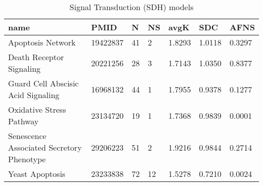 \begin{table}
\caption{Signal Transduction (SDH) models}
\label{tab:Signal_Transduction_(SDH)}
\begin{tabular}{|p{180pt}||p{40pt}|p{25pt}|p{25pt}|p{40pt}|p{25pt}|p{25pt}|}
\toprule
name & PMID & N & NS & avgK & SDC & AFNS \\
\midrule
Apoptosis Network & 19422837 & 41 & 2 & 1.8293 & 1.0118 & 0.3297 \\
Death Receptor Signaling & 20221256 & 28 & 3 & 1.7143 & 1.0350 & 0.8377 \\
Guard Cell Abscisic Acid Signaling & 16968132 & 44 & 1 & 1.7955 & 0.9378 & 0.1277 \\
Oxidative Stress Pathway & 23134720 & 19 & 1 & 1.7368 & 0.9839 & 0.0001 \\
Senescence Associated Secretory Phenotype & 29206223 & 51 & 2 & 1.9216 & 0.9844 & 0.2714 \\
Yeast Apoptosis & 23233838 & 72 & 12 & 1.5278 & 0.7210 & 0.0024 \\
\bottomrule
\end{tabular}
\end{table}
